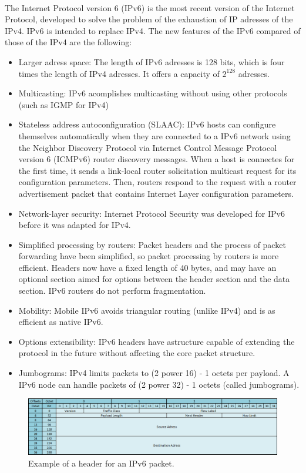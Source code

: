 \documentclass[12pt,a4paper]{report}
\begin{document}
\paragraph{}The Internet Protocol version 6 (IPv6) is the most recent version of the Internet Protocol, developed to solve the problem of the exhaustion of IP adresses of the IPv4. IPv6 is intended to replace IPv4. The new features of the IPv6 compared of those of the IPv4 are the following:
\begin{itemize}
	\item Larger adress space: The length of IPv6 adresses is 128 bits, which is four times the length of IPv4 adresses. It offers a capacity of $2^{128}$ adresses.
	\item Multicasting: IPv6 acomplishes multicasting without using other protocols (such as IGMP for IPv4)
	\item Stateless address autoconfiguration (SLAAC): IPv6 hosts can configure themselves automatically when they are connected to a IPv6 network using the Neighbor Discovery Protocol via Internet Control Message Protocol version 6 (ICMPv6) router discovery messages. When a host is connectes for the first time, it sends a link-local router solicitation multicast request for its configuration parameters. Then, routers respond to the request with a router advertisement packet that contains Internet Layer configuration parameters.
	\item Network-layer security: Internet Protocol Security was developed for IPv6 before it was adapted for IPv4.
	\item Simplified processing by routers: Packet headers and the process of packet forwarding have been simplified, so packet processing by routers is more efficient. Headers now have a fixed length of 40 bytes, and may have an optional section aimed for options between the header section and the data section. IPv6 routers do not perform fragmentation.
	\item Mobility: Mobile IPv6 avoids triangular routing (unlike IPv4) and is as efficient as native IPv6.
	\item Options extensibility: IPv6 headers have astructure capable of extending the protocol in the future without affecting the core packet structure.
	\item Jumbograms: IPv4 limits packets to (2 power 16) - 1 octets per payload. A IPv6 node can handle packets of (2 power 32) - 1 octets (called jumbograms).
\end{itemize}
\begin{figure}[H]
\begin{center}
\includegraphics[scale=0.6]{IPv6_header.PNG}
\caption[IPv6 header]{Example of a header for an IPv6 packet.}
\end{center}
\end{figure}
\end{document}
